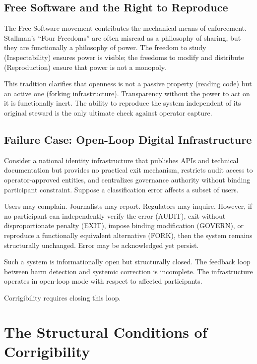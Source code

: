 \documentclass{article}
\begin{document}
\subsection{Free Software and the Right to Reproduce}

The Free Software movement \citep{stallman2002} contributes the mechanical means of enforcement. Stallman's ``Four Freedoms'' are often misread as a philosophy of sharing, but they are functionally a philosophy of power. The freedom to study (Inspectability) ensures power is visible; the freedoms to modify and distribute (Reproduction) ensure that power is not a monopoly.

This tradition clarifies that openness is not a passive property (reading code) but an active one (forking infrastructure). Transparency without the power to act on it is functionally inert. The ability to reproduce the system independent of its original steward is the only ultimate check against operator capture.

\subsection{Failure Case: Open-Loop Digital Infrastructure}
\label{subsec:failure-case}

Consider a national identity infrastructure that publishes APIs and technical documentation but provides no practical exit mechanism, restricts audit access to operator-approved entities, and centralizes governance authority without binding participant constraint. Suppose a classification error affects a subset of users.

Users may complain. Journalists may report. Regulators may inquire. However, if no participant can independently verify the error (AUDIT), exit without disproportionate penalty (EXIT), impose binding modification (GOVERN), or reproduce a functionally equivalent alternative (FORK), then the system remains structurally unchanged. Error may be acknowledged yet persist.

Such a system is informationally open but structurally closed. The feedback loop between harm detection and systemic correction is incomplete. The infrastructure operates in open-loop mode with respect to affected participants.

Corrigibility requires closing this loop.

\section{The Structural Conditions of Corrigibility}
\label{sec:tests}
\end{document}
